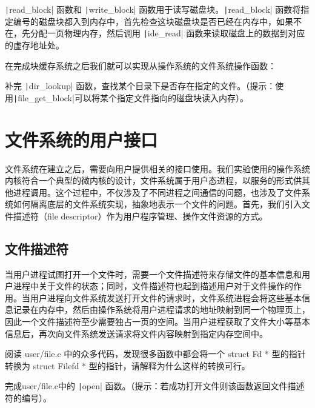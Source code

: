 \texttt|read_block| 函数和 \texttt|write_block| 函数用于读写磁盘块。\texttt|read_block|
函数将指定编号的磁盘块都入到内存中，首先检查这块磁盘块是否已经在内存中，如果不在，先分配一页物理内存，然后调用
\texttt|ide_read| 函数来读取磁盘上的数据到对应的虚存地址处。

在完成块缓存系统之后我们就可以实现从操作系统的文件系统操作函数：

\begin{exercise}
补完 \texttt|dir_lookup| 函数，查找某个目录下是否存在指定的文件。（提示：使用\texttt|file_get_block|可以将某个指定文件指向的磁盘块读入内存）。
\end{exercise}

\section{文件系统的用户接口}

文件系统在建立之后，需要向用户提供相关的接口使用。我们实验使用的操作系统内核符合一个典型的微内核的设计，文件系统属于用户态进程，以服务的形式供其他进程调用。这个过程中，不仅涉及了不同进程之间通信的问题，也涉及了文件系统如何隔离底层的文件系统实现，抽象地表示一个文件的问题。首先，我们引入文件描述符（file descriptor）作为用户程序管理、操作文件资源的方式。

\subsection{文件描述符}

当用户进程试图打开一个文件时，需要一个文件描述符来存储文件的基本信息和用户进程中关于文件的状态；同时，文件描述符也起到描述用户对于文件操作的作用。当用户进程向文件系统发送打开文件的请求时，文件系统进程会将这些基本信息记录在内存中，然后由操作系统将用户进程请求的地址映射到同一个物理页上，因此一个文件描述符至少需要独占一页的空间。当用户进程获取了文件大小等基本信息后，再次向文件系统发送请求将文件内容映射到指定内存空间中。

\begin{thinking}\label{think-Filefd-Fd}
阅读 user/file.c 中的众多代码，发现很多函数中都会将一个 struct Fd * 型的指针转换为 struct Filefd * 型的指针，请解释为什么这样的转换可行。
\end{thinking}

\begin{exercise}
完成user/file.c中的 \texttt|open| 函数。（提示：若成功打开文件则该函数返回文件描述符的编号）。
\end{exercise}

